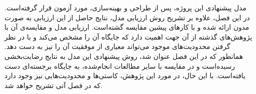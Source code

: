 

مدل پیشنهادی این پروژه، پس از طراحی و بهینه‌سازی، مورد آزمون قرار گرفته‌است.
در این فصل، علاوه بر تشریح روش ارزیابی مدل، نتایج حاصل از این ارزیابی به صورت مدون ارائه شده و با کارهای پیشین مقایسه گشته‌است.
ارزیابی مدل و مقایسه‌ی آن با پژوهش‌های گذشته از آن جهت اهمیت دارد که جایگاه آن را مشخص می‌کند و 
با در نظر گرفتن محدودیت‌های موجود می‌تواند معیاری از موفقیت آن را نیز به دست دهد.
همانطور که در این فصل عنوان شد، روش پیشنهادی این مدل به نتایج رضایت‌بخشی رسیده‌است و در مقایسه با سایر مطالعات انجام‌شده،
به جایگاه برجسته‌ای دست یافته‌است.
با این حال، در مورد این پژوهش، کاستی‌ها و محدودیت‌هایی نیز وجود دارد که در فصل آتی تشریح خواهد شد.

